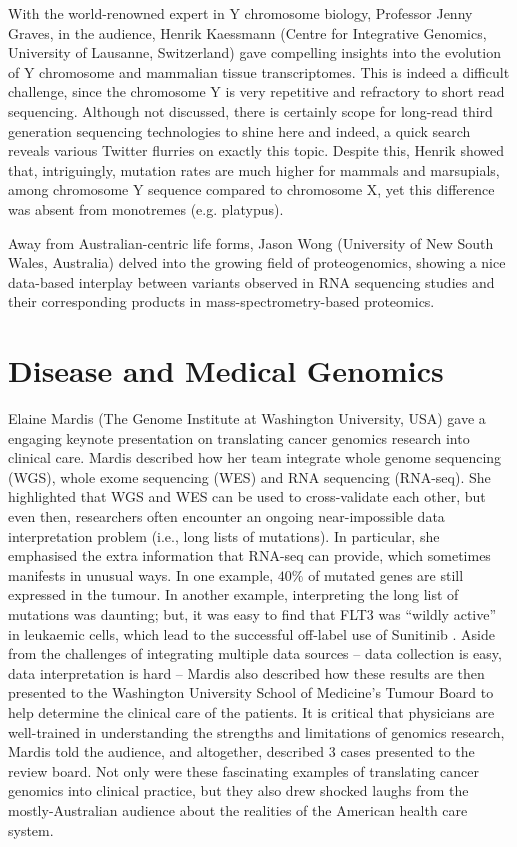 \documentclass[twocolumn]{bmcart}%
\begin{document}
With the world-renowned expert in Y chromosome biology, Professor Jenny Graves, in the audience, Henrik Kaessmann (Centre for Integrative Genomics, University of Lausanne, Switzerland) gave compelling insights into the evolution of Y chromosome and mammalian tissue transcriptomes.  This is indeed a difficult challenge, since the chromosome Y is very repetitive and refractory to short read sequencing. Although not discussed, there is certainly scope for long-read third generation sequencing technologies to shine here and indeed, a quick search reveals various Twitter flurries on exactly this topic.  Despite this, Henrik showed that, intriguingly, mutation rates are much higher for mammals and marsupials, among chromosome Y sequence compared to chromosome X, yet this difference was absent from monotremes (e.g. platypus).

Away from Australian-centric life forms, Jason Wong (University of New South Wales, Australia) delved into the growing field of proteogenomics, showing a nice data-based interplay between variants observed in RNA sequencing studies and their corresponding products in mass-spectrometry-based proteomics.



\section*{Disease and Medical Genomics}
Elaine Mardis (The Genome Institute at Washington University, USA) gave a engaging keynote presentation on translating cancer genomics research into clinical care. Mardis described how her team integrate whole genome sequencing (WGS), whole exome sequencing (WES) and RNA sequencing (RNA-seq).  She highlighted that WGS and WES can be used to cross-validate each other, but even then, researchers often encounter an ongoing near-impossible data interpretation problem (i.e., long lists of mutations).  In particular, she emphasised the extra information that RNA-seq can provide, which sometimes manifests in unusual ways.  In one example, $40\%$ of mutated genes are still expressed in the tumour.  In another example, interpreting the long list of mutations was daunting; but, it was easy to find that FLT3 was ``wildly active'' in leukaemic cells, which lead to the successful off-label use of Sunitinib \cite{NYTIMES}.  Aside from the challenges of integrating multiple data sources -- data collection is easy, data interpretation is hard -- Mardis also described how these results are then presented to the Washington University School of Medicine's Tumour Board to help determine the clinical care of the patients. It is critical that physicians are well-trained in understanding the strengths and limitations of genomics research, Mardis told the audience, and altogether, described 3 cases presented to the review board. Not only were these fascinating examples of translating cancer genomics into clinical practice, but they also drew shocked laughs from the mostly-Australian audience about the realities of the American health care system.
\end{document}
